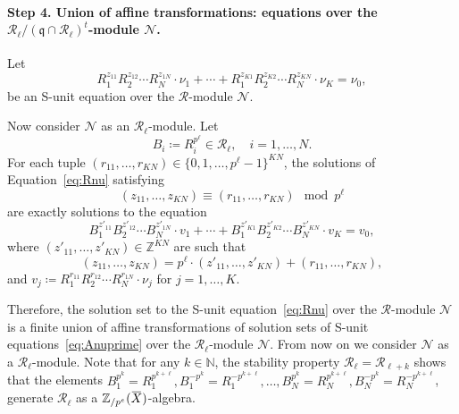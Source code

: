 \documentclass[letterpaper, 11pt, thm-restate]{article}
\numberwithin{equation}{section}
\newcommand{\Z}{\mathbb{Z}}
\newcommand{\N}{\mathbb{N}}
\newcommand{\Zpe}{\mathbb{Z}_{/p^e}}
\newcommand{\mN}{\mathcal{N}}
\newcommand{\mR}{\mathcal{R}}
\newcommand{\red}{\textcolor{red}}
\newcommand{\oX}{\mkern 1.5mu\overline{\mkern-1.5mu X \mkern-1.5mu}\mkern 1.5mu}
\newcommand{\frp}{\mathfrak{p}}
\newcommand{\frq}{\mathfrak{q}}
\theoremstyle{definition}
\theoremstyle{definition}
\theoremstyle{definition}
\begin{document}
\paragraph{Step 4. Union of affine transformations: equations over the $\mR_{\ell}/(\frq \cap \mR_{\ell})^t$-module $\mN$.}

Let
\begin{equation}\label{eq:Rnu}
     R_1^{z_{11}} R_2^{z_{12}} \cdots R_N^{z_{1N}} \cdot \nu_1 + \cdots + R_1^{z_{K1}} R_2^{z_{K2}} \cdots R_N^{z_{KN}} \cdot \nu_K = \nu_0,
\end{equation}
be an S-unit equation over the $\mR$-module $\mN$.

Now consider $\mN$ as an $\mR_{\ell}$-module.
Let 
\[
B_i \coloneqq R_i^{p^\ell} \in \mR_{\ell}, \quad i = 1, \ldots, N.
\]
For each tuple $(r_{11}, \ldots, r_{KN}) \in \{0, 1, \ldots, p^{\ell} - 1\}^{KN}$, the solutions of Equation~\eqref{eq:Rnu} satisfying 
\[
(z_{11}, \ldots, z_{KN}) \equiv (r_{11}, \ldots, r_{KN}) \mod p^{\ell}
\]
are exactly solutions to the equation
\begin{equation}\label{eq:Anuprime}
B_1^{z'_{11}} B_2^{z'_{12}} \cdots B_N^{z'_{1N}} \cdot v_1 + \cdots + B_1^{z'_{K1}} B_2^{z'_{K2}} \cdots B_N^{z'_{KN}} \cdot v_K = v_0,
\end{equation}
where $(z'_{11}, \ldots, z'_{KN}) \in \Z^{KN}$ are such that  
\[
(z_{11}, \ldots, z_{KN}) = p^{\ell} \cdot (z'_{11}, \ldots, z'_{KN}) + (r_{11}, \ldots, r_{KN}),
\]
and $v_j \coloneqq R_1^{r_{11}} R_2^{r_{12}} \cdots R_N^{r_{1N}} \cdot \nu_j$ for $j = 1, \ldots, K$.

Therefore, the solution set to the S-unit equation~\eqref{eq:Rnu} over the $\mR$-module $\mN$ is a finite union of affine transformations of solution sets of S-unit equations~\eqref{eq:Anuprime} over the $\mR_{\ell}$-module $\mN$.
From now on we consider $\mN$ as a $\mR_{\ell}$-module.
Note that for any $k \in \N$, the stability property $\mR_{\ell} = \mR_{\ell+k}$ shows that the elements $B_1^{p^k} = R_1^{p^{k + \ell}}, B_1^{-p^k} = R_1^{-p^{k + \ell}}, \ldots, B_N^{p^{k}} = R_N^{p^{k + \ell}}, B_N^{-p^{k}} = R_N^{-p^{k + \ell}}$, generate $\mR_{\ell}$ as a $\Zpe(\oX)$-algebra.

\end{document}
